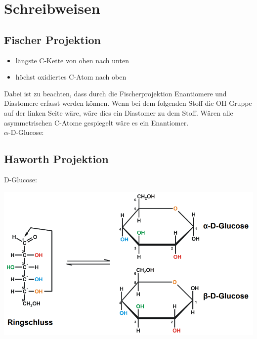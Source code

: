 \section{Schreibweisen}

\subsection{Fischer Projektion}
\label{sec:fischer}
\begin{itemize}
    \item längste C-Kette von oben nach unten
    \item höchst oxidiertes C-Atom nach oben
\end{itemize}

Dabei ist zu beachten, dass durch die Fischerprojektion Enantiomere und Diastomere erfasst werden können. 
Wenn bei dem folgenden Stoff die OH-Gruppe auf der linken Seite wäre, wäre dies ein Diastomer zu dem Stoff. 
Wären alle asymmetrischen C-Atome gespiegelt wäre es ein Enantiomer. \\
$\alpha$-D-Glucose:


\subsection{Haworth Projektion}
\label{sec:haworth}
D-Glucose:

\includegraphics[scale=0.86]{media/naturstoffe/haworth.png}

